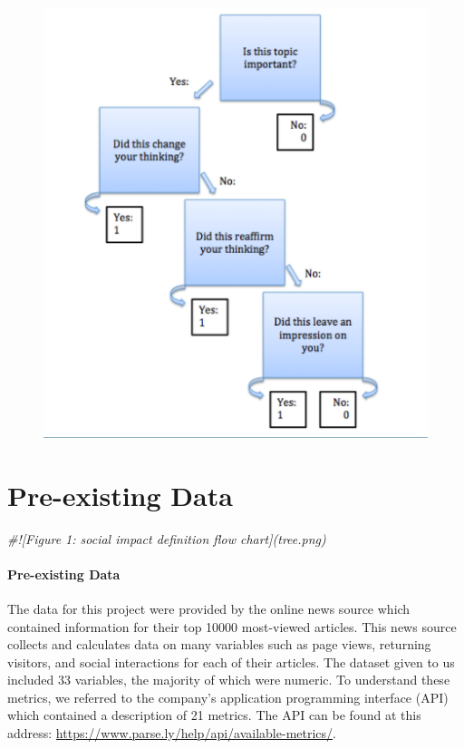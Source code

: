 \documentclass[10pt,letterpaper]{article}
\newenvironment{Shaded}{\begin{snugshade}}{\end{snugshade}}
\newcommand{\CommentTok}[1]{\textcolor[rgb]{0.56,0.35,0.01}{\textit{#1}}}
\begin{document}
\begin{figure}
\centering
\includegraphics{tree.png}
\caption{}
\end{figure}

\section{Pre-existing Data}\label{pre-existing-data}

\begin{Shaded}
\begin{Highlighting}[]
\CommentTok{#![Figure 1: social impact definition flow chart](tree.png)}
\end{Highlighting}
\end{Shaded}

\hypertarget{pre-existing-data}{%
\paragraph{Pre-existing Data}\label{pre-existing-data}}


The data for this project were provided by the online news source which
contained information for their top 10000 most-viewed articles. This
news source collects and calculates data on many variables such as page
views, returning visitors, and social interactions for each of their
articles. The dataset given to us included 33 variables, the majority of
which were numeric. To understand these metrics, we referred to the
company's application programming interface (API) which contained a
description of 21 metrics. The API can be found at this address:
\url{https://www.parse.ly/help/api/available-metrics/}.
\end{document}
